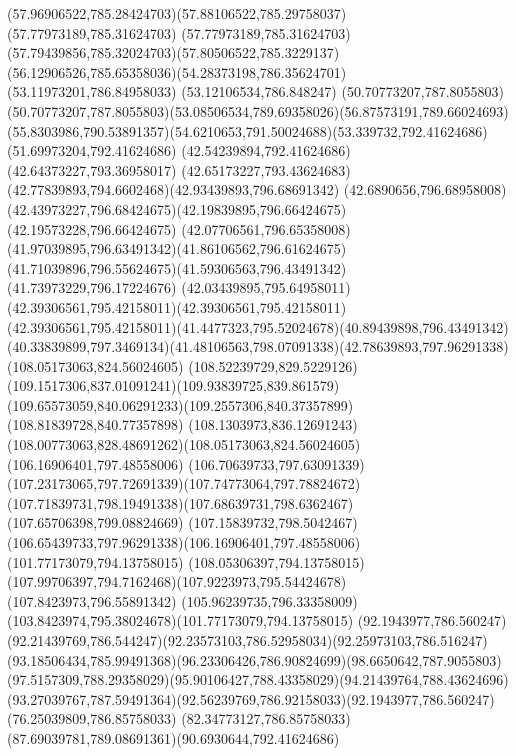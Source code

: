 {{		\curveto(57.96906522,785.28424703)(57.88106522,785.29758037)(57.77973189,785.31624703)
		\curveto(57.77973189,785.31624703)(57.79439856,785.32024703)(57.80506522,785.3229137)
		\curveto(56.12906526,785.65358036)(54.28373198,786.35624701)(53.11973201,786.84958033)
		\lineto(53.12106534,786.848247)
		\lineto(50.70773207,787.8055803)
		\curveto(50.70773207,787.8055803)(53.08506534,789.69358026)(56.87573191,789.66024693)
		\curveto(55.8303986,790.53891357)(54.6210653,791.50024688)(53.339732,792.41624686)
		\lineto(51.69973204,792.41624686)
		\lineto(42.54239894,792.41624686)
		\lineto(42.64373227,793.36958017)
		\curveto(42.65173227,793.43624683)(42.77839893,794.6602468)(42.93439893,796.68691342)
		\curveto(42.6890656,796.68958008)(42.43973227,796.68424675)(42.19839895,796.66424675)
		\lineto(42.19573228,796.66424675)
		\curveto(42.07706561,796.65358008)(41.97039895,796.63491342)(41.86106562,796.61624675)
		\curveto(41.71039896,796.55624675)(41.59306563,796.43491342)(41.73973229,796.17224676)
		\curveto(42.03439895,795.64958011)(42.39306561,795.42158011)(42.39306561,795.42158011)
		\curveto(42.39306561,795.42158011)(41.4477323,795.52024678)(40.89439898,796.43491342)
		\curveto(40.33839899,797.3469134)(41.48106563,798.07091338)(42.78639893,797.96291338)
		\moveto(108.05173063,824.56024605)
		\curveto(108.52239729,829.5229126)(109.1517306,837.01091241)(109.93839725,839.861579)
		\curveto(109.65573059,840.06291233)(109.2557306,840.37357899)(108.81839728,840.77357898)
		\curveto(108.1303973,836.12691243)(108.00773063,828.48691262)(108.05173063,824.56024605)
		\moveto(106.16906401,797.48558006)
		\curveto(106.70639733,797.63091339)(107.23173065,797.72691339)(107.74773064,797.78824672)
		\curveto(107.71839731,798.19491338)(107.68639731,798.6362467)(107.65706398,799.08824669)
		\curveto(107.15839732,798.5042467)(106.65439733,797.96291338)(106.16906401,797.48558006)
		\moveto(101.77173079,794.13758015)
		\lineto(108.05306397,794.13758015)
		\curveto(107.99706397,794.7162468)(107.9223973,795.54424678)(107.8423973,796.55891342)
		\curveto(105.96239735,796.33358009)(103.8423974,795.38024678)(101.77173079,794.13758015)
		\moveto(92.1943977,786.560247)
		\curveto(92.21439769,786.544247)(92.23573103,786.52958034)(92.25973103,786.516247)
		\curveto(93.18506434,785.99491368)(96.23306426,786.90824699)(98.6650642,787.9055803)
		\curveto(97.5157309,788.29358029)(95.90106427,788.43358029)(94.21439764,788.43624696)
		\curveto(93.27039767,787.59491364)(92.56239769,786.92158033)(92.1943977,786.560247)
		\moveto(76.25039809,786.85758033)
		\curveto(82.34773127,786.85758033)(87.69039781,789.08691361)(90.6930644,792.41624686)
}}

